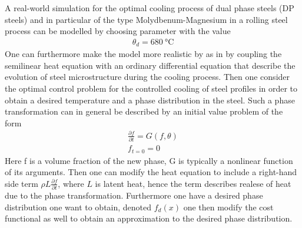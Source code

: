 A real-world simulation for the optimal cooling process of dual phase steels (DP steels) and in particular of the type Molydbenum-Magnesium in a rolling steel process can be modelled by choosing parameter with the value 
\begin{align*}
    \theta_d = \SI{680}{\celsius}
\end{align*}
One can furthermore make the model more realistic by as in \cite{DPSteelOverview} by coupling the semilinear heat equation with an ordinary differential equation that describe the evolution of steel microstructure during the cooling process. Then one consider the optimal control problem for the controlled cooling of steel profiles in order to obtain a desired temperature and a phase distribution in the steel. Such a phase transformation can in general be described by an initial value problem of the form 
\begin{align*}
    \frac{\partial f}{\partial t} = G(f,\theta ) \\
    f_{t=0} = 0
\end{align*}
Here f is a volume fraction of the new phase, G is typically a nonlinear function of its arguments. Then one can modify the heat equation to include a right-hand side term $\rho L \frac{\partial f}{\partial t}$, where $L$ is latent heat, hence the term describes realese of heat due to the phase transformation. Furthermore one have a desired phase distribution one want to obtain, denoted $f_d(x)$ one then modify the cost functional as well to obtain an approximation to the desired phase distribution. 